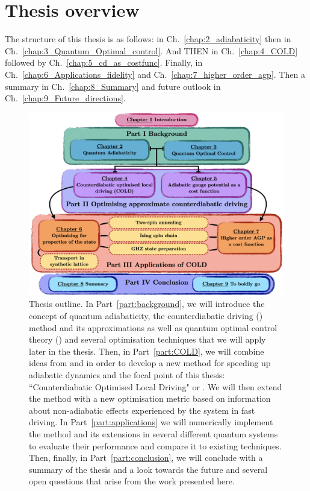 \section{Thesis overview}

The structure of this thesis is as follows: in Ch.~\ref{chap:2_adiabaticity} then in Ch.~\ref{chap:3_Quantum_Optimal_control}. And THEN in Ch.~\ref{chap:4_COLD} followed by Ch.~\ref{chap:5_cd_as_costfunc}. Finally, in Ch.~\ref{chap:6_Applications_fidelity} and Ch.~\ref{chap:7_higher_order_agp}. Then a summary in Ch.~\ref{chap:8_Summary} and future outlook in Ch.~\ref{chap:9_Future_directions}.

\begin{figure}[t!]
    \centering
    \includegraphics[width=\linewidth]{images/thesis_overview.png} \caption[Thesis outline.]{Thesis outline. In Part~\ref{part:background}, we will introduce the concept of quantum adiabaticity, the counterdiabatic driving () method and its approximations as well as quantum optimal control theory () and several optimisation techniques that we will apply later in the thesis. Then, in Part~\ref{part:COLD}, we will combine ideas from  and  in order to develop a new method for speeding up adiabatic dynamics and the focal point of this thesis: ``Counterdiabatic Optimised Local Driving" or . We will then extend the method with a new optimisation metric based on information about non-adiabatic effects experienced by the system in fast driving. In Part~\ref{part:applications} we will numerically implement the  method and its extensions in several different quantum systems to evaluate their performance and compare it to existing techniques. Then, finally, in Part~\ref{part:conclusion}, we will conclude with a summary of the thesis and a look towards the future and several open questions that arise from the work presented here.}\label{fig:thesis_overview}
\end{figure}

